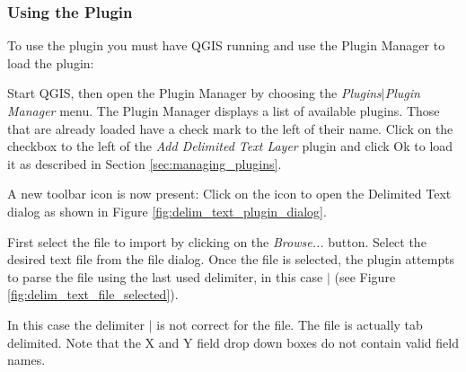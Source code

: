 \subsubsection{Using the Plugin}
To use the plugin you must have QGIS running and use the Plugin Manager to
load the plugin:

Start QGIS, then open the Plugin Manager by choosing the {\em
Plugins\mbox{$|$}Plugin Manager} menu. The Plugin Manager displays a list of
available plugins. Those that are already loaded have a check mark to the
left of their name. Click on the checkbox to the left of the {\em Add
Delimited Text Layer} plugin and click Ok to load it as described in Section
\ref{sec:managing_plugins}.


A new toolbar icon is now present:
Click on the icon to open the Delimited Text dialog as shown in Figure
\ref{fig:delim_text_plugin_dialog}.


First select the file to import by clicking on the \textit{Browse...} button.
Select the desired text file from the file dialog.
Once the file is selected, the plugin attempts to parse the file using the
last used delimiter, in this case \mbox{$|$} (see Figure
\ref{fig:delim_text_file_selected}).

  
In this case the delimiter \mbox{$|$} is not correct for the file. The file is
actually tab delimited. Note that the X and Y field drop down boxes do not
contain valid field names.


